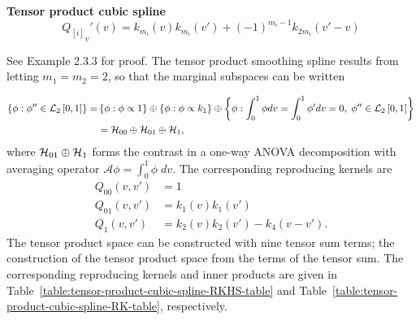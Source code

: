 \begin{example}{\textbf {Tensor product cubic spline}}
\begin{equation}
{Q_{\left[i\right]} }_v'\left(v\right) = k_{m_i}\left(v\right)k_{m_i}\left(v'\right) + \left(-1\right)^{m_i-1}k_{2m_i}\left(v' - v\right)
\end{equation}

\noindent
See \cite{gu2002smoothing} Example 2.3.3 for proof. The tensor product smoothing spline results from letting $m_1 = m_2 = 2$, so that the marginal subspaces can be written

\begin{align} \label{eq:cubic-spline-hilbert-space}
\left\{ \phi: \phi'' \in \mathcal{L}_2\left[0,1\right] \right\} = &\left\{ \phi: \phi \propto 1 \right\} \oplus  \left\{ \phi: \phi \propto k_1 \right\} \oplus \left\{ \phi: \int_0^1 \phi dv = \int_0^1 \phi' dv = 0,\; \phi'' \in \mathcal{L}_2\left[0,1\right]  \right\} \\
&= \mathcal{H}_{00} \oplus \mathcal{H}_{01} \oplus \mathcal{H}_1,
\end{align}
\noindent
where $ \mathcal{H}_{01} \oplus \mathcal{H}_1$ forms the contrast in a one-way ANOVA decomposition with averaging operator $\mathcal{A}\phi = \int_0^1 \phi\;dv$. The corresponding reproducing kernels are
\begin{align} \label{eq:cubic-spline-hilbert-space-rks}
Q_{00}\left(v,v'\right) &= 1\\
Q_{01}\left(v,v'\right) &= k_1\left(v\right)k_1\left(v'\right)\\
Q_{1}\left(v,v'\right) &= k_2\left(v\right)k_2\left(v'\right) - k_4\left(v-v'\right).
\end{align}
\noindent
The tensor product space can be constructed with nine tensor sum terms; the construction of the tensor product space from the terms of the tensor sum. The corresponding reproducing kernels and inner products are given in Table~\ref{table:tensor-product-cubic-spline-RKHS-table} and Table~\ref{table:tensor-product-cubic-spline-RK-table}, respectively.


\end{example}

